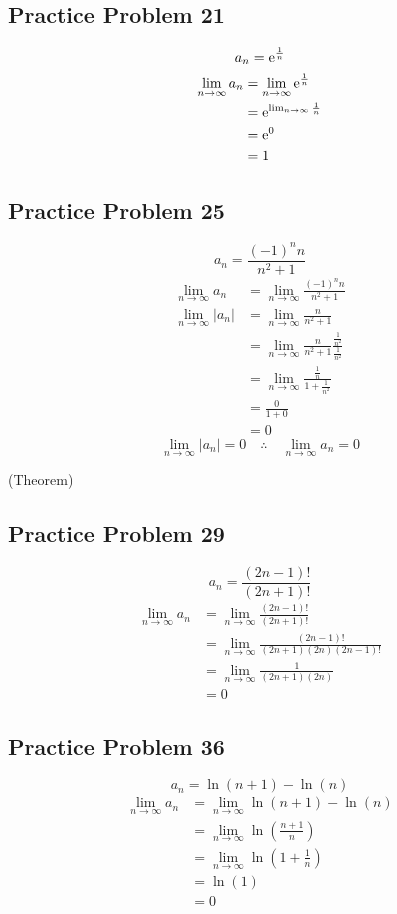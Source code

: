 \documentclass{math}
\begin{document}
\subsection*{Practice Problem 21}
\[ a_{n} = \mathrm{e}^{\frac{1}{n}} \]
\begin{align*}
  \lim_{n\to\infty}{a_{n}} &= \lim_{n\to\infty}{\mathrm{e}^{\frac{1}{n}}} \\
  &= \mathrm{e}^{\lim_{n\to\infty}{\frac{1}{n}}} \\
  &= \mathrm{e}^{0} \\
  &= 1
\end{align*}

\subsection*{Practice Problem 25}
\[ a_{n} = \frac{(-1)^{n}n}{n^{2}+1} \]
\begin{align*}
  \lim_{n\to\infty}{a_{n}} &= \lim_{n\to\infty}{\frac{(-1)^{n}n}{n^{2}+1}} \\
  \lim_{n\to\infty}{|a_{n}|} &= \lim_{n\to\infty}{\frac{n}{n^{2}+1}} \\
  &= \lim_{n\to\infty}
    {\frac{n}{n^{2}+1}\frac{\frac{1}{n^{2}}}{\frac{1}{n^{2}}}} \\
  &= \lim_{n\to\infty}
    {\frac{\frac{1}{n}}{1+\frac{1}{n^{2}}}} \\
  &= \frac{0}{1+0} \\
  &= 0
\end{align*}
\[ \lim_{n\to\infty}{|a_{n}|} = 0 \quad \therefore \quad
   \lim_{n\to\infty}{a_{n}} = 0 \]
\begin{center}
  (Theorem)
\end{center}

\subsection*{Practice Problem 29}
\[ a_{n} = \frac{(2n-1)!}{(2n+1)!} \]
\begin{align*}
  \lim_{n\to\infty}{a_{n}} &= \lim_{n\to\infty}{\frac{(2n-1)!}{(2n+1)!}} \\
  &= \lim_{n\to\infty}{\frac{(2n-1)!}{(2n+1)(2n)(2n-1)!}} \\
  &= \lim_{n\to\infty}{\frac{1}{(2n+1)(2n)}} \\
  &= 0
\end{align*}

\subsection*{Practice Problem 36}
\[ a_{n} = \ln(n+1)-\ln(n) \]
\begin{align*}
  \lim_{n\to\infty}{a_{n}} &= \lim_{n\to\infty}{\ln(n+1)-\ln(n)} \\
  &= \lim_{n\to\infty}{\ln(\frac{n+1}{n})} \\
  &= \lim_{n\to\infty}{\ln(1+\frac{1}{n})} \\
  &= \ln(1) \\
  &= 0
\end{align*}
\end{document}
